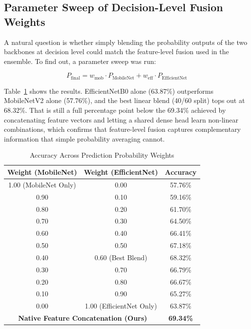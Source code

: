 \documentclass[conference]{IEEEtran}
\begin{document}
\subsection{Parameter Sweep of Decision-Level Fusion Weights}
A natural question is whether simply blending the probability outputs of the two backbones at decision level could match the feature-level fusion used in the ensemble. To find out, a parameter sweep was run:

\begin{equation}
P_{\text{final}} = w_{\text{mob}} \cdot P_{\text{MobileNet}} + w_{\text{eff}} \cdot P_{\text{EfficientNet}}
\end{equation}

Table~\ref{tab:weight_sweep} shows the results. EfficientNetB0 alone (63.87\%) outperforms MobileNetV2 alone (57.76\%), and the best linear blend (40/60 split) tops out at 68.32\%. That is still a full percentage point below the 69.34\% achieved by concatenating feature vectors and letting a shared dense head learn non-linear combinations, which confirms that feature-level fusion captures complementary information that simple probability averaging cannot.

\begin{table}[h]
\centering
\caption{Accuracy Across Prediction Probability Weights}
\label{tab:weight_sweep}
\begin{tabular}{ccc}
\toprule
\textbf{Weight (MobileNet)} & \textbf{Weight (EfficientNet)} & \textbf{Accuracy} \\
\midrule
1.00 (MobileNet Only) & 0.00 & 57.76\% \\
0.90 & 0.10 & 59.16\% \\
0.80 & 0.20 & 61.70\% \\
0.70 & 0.30 & 64.50\% \\
0.60 & 0.40 & 66.41\% \\
0.50 & 0.50 & 67.18\% \\
0.40 & 0.60 (Best Blend) & 68.32\% \\
0.30 & 0.70 & 66.79\% \\
0.20 & 0.80 & 66.67\% \\
0.10 & 0.90 & 65.27\% \\
0.00 & 1.00 (EfficientNet Only) & 63.87\% \\
\midrule
\multicolumn{2}{c}{\textbf{Native Feature Concatenation (Ours)}} & \textbf{69.34\%} \\
\bottomrule
\end{tabular}
\end{table}
\end{document}
